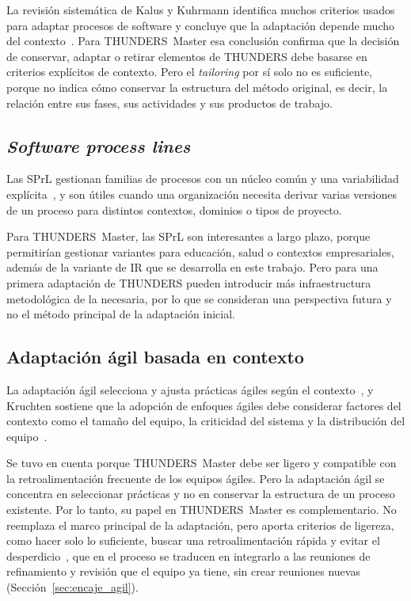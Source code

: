 \documentclass[12pt,letterpaper,oneside]{report}
\begin{document}
La revisión sistemática de Kalus y Kuhrmann identifica muchos criterios usados
para adaptar procesos de software y concluye que la adaptación depende mucho
del contexto~\cite{kalus2013tailoring}. Para THUNDERS~Master esa conclusión confirma que la decisión de conservar,
adaptar o retirar elementos de THUNDERS debe basarse en criterios explícitos de
contexto. Pero el \textit{tailoring} por sí solo no es suficiente, porque no
indica cómo conservar la estructura del método original, es decir, la relación
entre sus fases, sus actividades y sus productos de trabajo.

\subsection{\textit{Software process lines}}
Las SPrL gestionan familias de procesos con un núcleo común y una variabilidad
explícita~\cite{kuhrmann2016}, y son útiles cuando una organización necesita
derivar varias versiones de un proceso para distintos contextos, dominios o
tipos de proyecto.

Para THUNDERS~Master, las SPrL son interesantes a largo plazo, porque permitirían gestionar variantes para educación, salud o contextos
empresariales, además de la variante de IR que se desarrolla en este trabajo.
Pero para una primera adaptación de THUNDERS pueden introducir más
infraestructura metodológica de la necesaria, por lo que se consideran una
perspectiva futura y no el método principal de la adaptación inicial.

\subsection{Adaptación ágil basada en contexto}
La adaptación ágil selecciona y ajusta prácticas ágiles según el
contexto~\cite{campanelli2015agile}, y Kruchten sostiene que la adopción de enfoques ágiles debe considerar factores
del contexto como el tamaño del equipo, la criticidad del sistema y la
distribución del equipo~\cite{kruchten2013}.

Se tuvo en cuenta porque THUNDERS~Master debe ser ligero y compatible con la
retroalimentación frecuente de los equipos ágiles. Pero la adaptación ágil se
concentra en seleccionar prácticas y no en conservar la estructura de un proceso
existente. Por lo tanto, su papel en THUNDERS~Master es complementario. No
reemplaza el marco principal de la adaptación, pero aporta criterios de
ligereza, como hacer solo lo suficiente, buscar una retroalimentación rápida y
evitar el desperdicio~\cite{campanelli2015agile}, que en el proceso se traducen
en integrarlo a las reuniones de refinamiento y revisión que el equipo ya tiene,
sin crear reuniones nuevas (Sección~\ref{sec:encaje_agil}).
\end{document}
